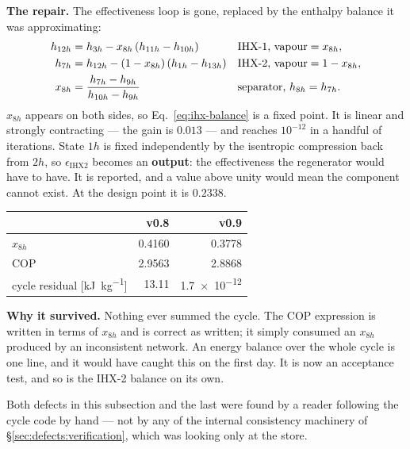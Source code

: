 \medskip
\noindent\textbf{The repair.} The effectiveness loop is gone, replaced by the
enthalpy balance it was approximating:
\begin{align}
  h_{12h} &= h_{3h}  - x_{8h}\left(h_{11h}-h_{10h}\right)
    && \text{IHX-1, vapour} = x_{8h}, \notag\\
  h_{7h}  &= h_{12h} - \left(1-x_{8h}\right)\left(h_{1h}-h_{13h}\right)
    && \text{IHX-2, vapour} = 1-x_{8h}, \label{eq:ihx-balance}\\
  x_{8h}  &= \frac{h_{7h}-h_{9h}}{h_{10h}-h_{9h}}
    && \text{separator, } h_{8h}=h_{7h}. \notag
\end{align}
$x_{8h}$ appears on both sides, so Eq.~\eqref{eq:ihx-balance} is a fixed point.
It is linear and strongly contracting --- the gain is $0.013$ --- and reaches
$10^{-12}$ in a handful of iterations. State $1h$ is fixed independently by the
isentropic compression back from $2h$, so $\epsilon_{\mathrm{IHX2}}$ becomes an
\textbf{output}: the effectiveness the regenerator would have to have. It is
reported, and a value above unity would mean the component cannot exist. At the
design point it is $0.2338$.

\begin{center}
\begin{tabular}{@{}l r r@{}}
\toprule
 & v0.8 & v0.9 \\
\midrule
$x_{8h}$                 & 0.4160 & 0.3778 \\
$\mathrm{COP}$           & 2.9563 & 2.8868 \\
cycle residual [\si{\kilo\joule\per\kilogram}]
                         & 13.11 & \num{1.7e-12} \\
\bottomrule
\end{tabular}
\end{center}

\medskip
\noindent\textbf{Why it survived.} Nothing ever summed the cycle. The COP
expression is written in terms of $x_{8h}$ and is correct as written; it simply
consumed an $x_{8h}$ produced by an inconsistent network. An energy balance over
the whole cycle is one line, and it would have caught this on the first day. It
is now an acceptance test, and so is the IHX-2 balance on its own.

\medskip
\noindent
Both defects in this subsection and the last were found by a reader following
the cycle code by hand --- not by any of the internal consistency machinery of
\S\ref{sec:defects:verification}, which was looking only at the store.

